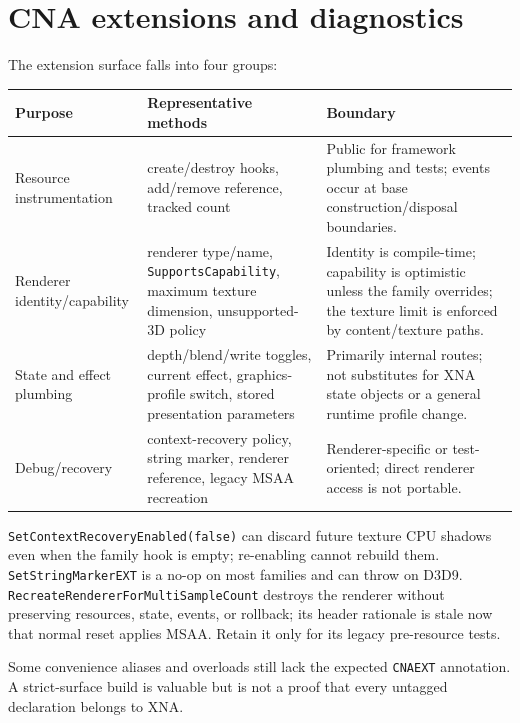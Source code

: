 \section{CNA extensions and diagnostics}
\label{sec:cnaext-helpers}
\label{sec:noxna-helpers}

The extension surface falls into four groups:

\begin{center}
\small
\begin{tabular}{@{}p{}p{}p{}@{}}
\toprule
\textbf{Purpose} & \textbf{Representative methods} & \textbf{Boundary} \\
\midrule
Resource instrumentation & create/destroy hooks, add/remove reference, tracked count & Public for framework plumbing and tests; events occur at base construction/disposal boundaries. \\
Renderer identity/capability & renderer type/name, \texttt{SupportsCapability}, maximum texture dimension, unsupported-3D policy & Identity is compile-time; capability is optimistic unless the family overrides; the texture limit is enforced by content/texture paths. \\
State and effect plumbing & depth/blend/write toggles, current effect, graphics-profile switch, stored presentation parameters & Primarily internal routes; not substitutes for XNA state objects or a general runtime profile change. \\
Debug/recovery & context-recovery policy, string marker, renderer reference, legacy MSAA recreation & Renderer-specific or test-oriented; direct renderer access is not portable. \\
\bottomrule
\end{tabular}
\end{center}

\texttt{SetContextRecoveryEnabled(false)} can discard future texture CPU shadows even when the
family hook is empty; re-enabling cannot rebuild them. \texttt{SetStringMarkerEXT} is a no-op on
most families and can throw on D3D9. \texttt{RecreateRendererForMultiSampleCount} destroys the
renderer without preserving resources, state, events, or rollback; its header rationale is stale
now that normal reset applies MSAA. Retain it only for its legacy pre-resource tests.

Some convenience aliases and overloads still lack the expected \texttt{CNAEXT} annotation. A
strict-surface build is valuable but is not a proof that every untagged declaration belongs to
XNA.

